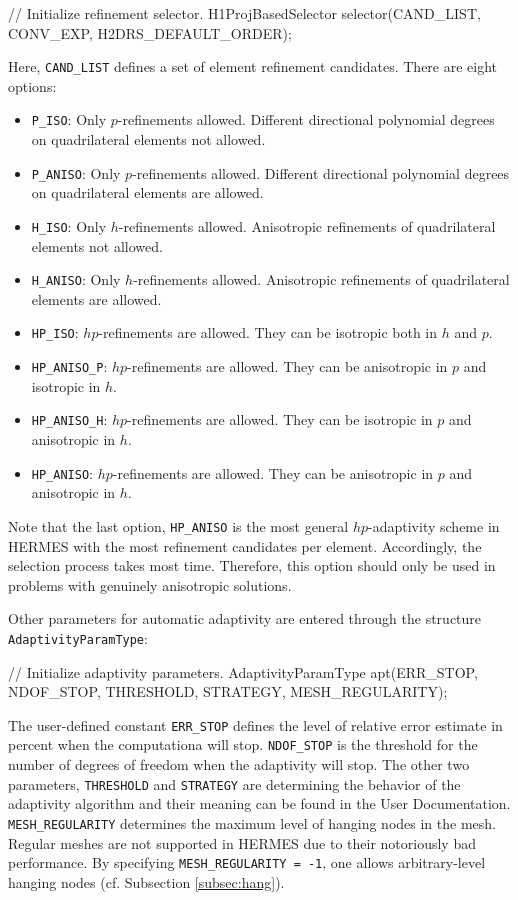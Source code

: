 \documentclass[final,3p,times,twocolumn]{elsarticle}
\begin{document}
\begin{code}
  // Initialize refinement selector.
  H1ProjBasedSelector selector(CAND_LIST, CONV_EXP, 
                               H2DRS_DEFAULT_ORDER);
\end{code}
Here, {\tt CAND\_LIST} defines a set of element refinement candidates.
There are eight options:
\begin{itemize}
\item {\tt P\_ISO}: Only $p$-refinements allowed. Different directional 
      polynomial degrees on quadrilateral elements not allowed. 
\item {\tt P\_ANISO}: Only $p$-refinements allowed. Different directional 
      polynomial degrees on quadrilateral elements are allowed. 
\item {\tt H\_ISO}: Only $h$-refinements allowed. Anisotropic refinements
      of quadrilateral elements not allowed. 
\item {\tt H\_ANISO}: Only $h$-refinements allowed. Anisotropic refinements
      of quadrilateral elements are allowed. 
\item {\tt HP\_ISO}: $hp$-refinements are allowed. They can be isotropic 
      both in $h$ and $p$.
\item {\tt HP\_ANISO\_P}: $hp$-refinements are allowed. They can be anisotropic 
      in $p$ and isotropic in $h$.
\item {\tt HP\_ANISO\_H}: $hp$-refinements are allowed. They can be isotropic 
      in $p$ and anisotropic in $h$.
\item {\tt HP\_ANISO}: $hp$-refinements are allowed. They can be anisotropic 
      in $p$ and anisotropic in $h$. 
\end{itemize}
Note that the last option, {\tt HP\_ANISO} is the most general $hp$-adaptivity
scheme in HERMES with the most refinement candidates per element. Accordingly,
the selection process takes most time. Therefore, this option should only be 
used in problems with genuinely anisotropic solutions. 

Other parameters for automatic adaptivity are entered through the 
structure {\tt AdaptivityParamType}:

\begin{code}
  // Initialize adaptivity parameters.
  AdaptivityParamType apt(ERR_STOP, NDOF_STOP, 
                          THRESHOLD, STRATEGY, 
                          MESH_REGULARITY);
\end{code}
The user-defined constant {\tt ERR\_STOP} defines the level of 
relative error estimate in percent when the computationa will stop. 
{\tt NDOF\_STOP} is the threshold for the number of degrees of freedom 
when the adaptivity will stop. The other two parameters, {\tt THRESHOLD}
and {\tt STRATEGY} are determining the behavior of the adaptivity 
algorithm and their meaning can be found in the User Documentation.
{\tt MESH\_REGULARITY} determines the maximum level of hanging nodes
in the mesh. Regular meshes are not supported in HERMES due to their 
notoriously bad performance. By specifying {\tt MESH\_REGULARITY = -1},
one allows arbitrary-level hanging nodes (cf. Subsection 
\ref{subsec:hang}).
\end{document}
